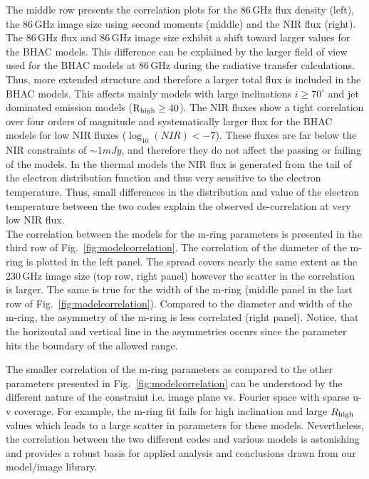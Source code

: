 The middle row presents the correlation plots for the 86\,GHz flux density (left), the 86\,GHz image size using second moments (middle) and the NIR flux (right). The 86\,GHz flux and 86\,GHz image size exhibit a shift toward larger values for the BHAC models. This difference can be explained by the larger field of view used for the BHAC models at 86\,GHz during the radiative transfer calculations. Thus, more extended structure and therefore a larger total flux is included in the BHAC models. This affects mainly models with large inclinations $i\geq70^\circ$ and jet dominated emission models ($\rm{R}_{\rm high}\geq 40$).
\newline The NIR fluxes show a tight correlation over four orders of magnitude and systematically larger flux for the BHAC models for low NIR fluxes ($\log_{10}(NIR)<-7$). These fluxes are far below the NIR constraints of $\sim 1mJy$, and therefore they do not affect the passing or failing of the models. In the thermal models the NIR flux is generated from the tail of the electron distribution function and thus very sensitive to the electron temperature. Thus, small differences in the distribution and value of the electron temperature between the two codes explain the observed de-correlation at very low NIR flux.  \\

The correlation between the models for the m-ring parameters is presented in the third row of Fig.~\ref{fig:modelcorrelation}. The correlation of the diameter of the m-ring is plotted in the left panel. The spread covers nearly the same extent as the 230\,GHz image size (top row, right panel) however the scatter in the correlation is larger.
The same is true for the width of the m-ring (middle panel in the last row of Fig.~\ref{fig:modelcorrelation}). Compared to the diameter and width of the m-ring, the asymmetry of the m-ring is less correlated (right panel). Notice, that the horizontal and vertical line in the asymmetries occurs since the parameter hits the boundary of the allowed range.

The smaller correlation of the m-ring parameters as compared to the other parameters presented in Fig.~\ref{fig:modelcorrelation} can be
 understood by the different nature of the constraint i.e. image plane vs. Fourier space with sparse u-v coverage. For example, the m-ring fit fails for high inclination and large $R_\mathrm{high}$ values which leads to a large scatter in parameters for these models. %
Nevertheless, the correlation between the two different codes and various models is astonishing and provides a robust basis for applied analysis and conclusions drawn from our model/image library.

